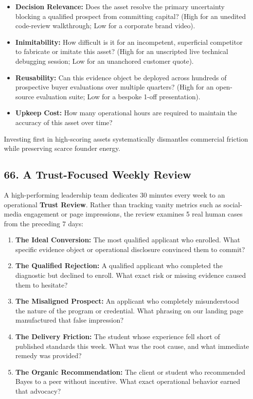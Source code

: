 \begin{itemize}
\item \textbf{Decision Relevance:} Does the asset resolve the primary uncertainty blocking a qualified prospect from committing capital? (High for an unedited code-review walkthrough; Low for a corporate brand video).
\item \textbf{Inimitability:} How difficult is it for an incompetent, superficial competitor to fabricate or imitate this asset? (High for an unscripted live technical debugging session; Low for an unanchored customer quote).
\item \textbf{Reusability:} Can this evidence object be deployed across hundreds of prospective buyer evaluations over multiple quarters? (High for an open-source evaluation suite; Low for a bespoke 1-off presentation).
\item \textbf{Upkeep Cost:} How many operational hours are required to maintain the accuracy of this asset over time?
\end{itemize}

Investing first in high-scoring assets systematically dismantles commercial friction while preserving scarce founder energy.

\subsection*{66. A Trust-Focused Weekly Review}

A high-performing leadership team dedicates 30 minutes every week to an operational \textbf{Trust Review}. Rather than tracking vanity metrics such as social-media engagement or page impressions, the review examines 5 real human cases from the preceding 7 days:
\begin{enumerate}
\item \textbf{The Ideal Conversion:} The most qualified applicant who enrolled. What specific evidence object or operational disclosure convinced them to commit?
\item \textbf{The Qualified Rejection:} A qualified applicant who completed the diagnostic but declined to enroll. What exact risk or missing evidence caused them to hesitate?
\item \textbf{The Misaligned Prospect:} An applicant who completely misunderstood the nature of the program or credential. What phrasing on our landing page manufactured that false impression?
\item \textbf{The Delivery Friction:} The student whose experience fell short of published standards this week. What was the root cause, and what immediate remedy was provided?
\item \textbf{The Organic Recommendation:} The client or student who recommended Bayes to a peer without incentive. What exact operational behavior earned that advocacy?
\end{enumerate}

